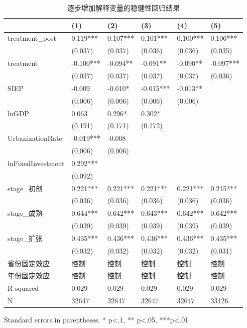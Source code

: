 \begin{table}
\caption{逐步增加解释变量的稳健性回归结果}
\label{}
\begin{center}
\begin{tabular}{llllll}
\hline
                  & (1)       & (2)       & (3)       & (4)       & (5)        \\
\hline
treatment\_post   & 0.119***  & 0.107***  & 0.101***  & 0.100***  & 0.106***   \\
                  & (0.037)   & (0.037)   & (0.036)   & (0.036)   & (0.035)    \\
treatment         & -0.100*** & -0.094**  & -0.091**  & -0.090**  & -0.097***  \\
                  & (0.037)   & (0.037)   & (0.037)   & (0.037)   & (0.036)    \\
SIEP            & -0.009    & -0.010*   & -0.015*** & -0.013**  &            \\
                  & (0.006)   & (0.006)   & (0.006)   & (0.006)   &            \\
lnGDP             & 0.063     & 0.296*    & 0.302*    &           &            \\
                  & (0.191)   & (0.171)   & (0.172)   &           &            \\
UrbanizationRate              & -0.019*** & -0.008    &           &           &            \\
                  & (0.006)   & (0.006)   &           &           &            \\
lnFixedInvestment & 0.292***  &           &           &           &            \\
                  & (0.092)   &           &           &           &            \\
stage\_初创         & 0.221***  & 0.221***  & 0.221***  & 0.221***  & 0.215***   \\
                  & (0.036)   & (0.036)   & (0.036)   & (0.036)   & (0.036)    \\
stage\_成熟         & 0.644***  & 0.642***  & 0.643***  & 0.642***  & 0.642***   \\
                  & (0.039)   & (0.039)   & (0.039)   & (0.039)   & (0.039)    \\
stage\_扩张         & 0.435***  & 0.436***  & 0.436***  & 0.436***  & 0.435***   \\
                  & (0.032)   & (0.032)   & (0.032)   & (0.032)   & (0.031)    \\
省份固定效应  & 控制 & 控制 & 控制 & 控制 & 控制 \\ 
 年份固定效应  & 控制 & 控制 & 控制 & 控制 & 控制 \\ 
\hline

R-squared         & 0.029     & 0.029     & 0.029     & 0.029     & 0.029      \\
N                 & 32647     & 32647     & 32647     & 32647     & 33126      \\
\hline
\end{tabular}
\end{center}
\end{table}
\bigskip
Standard errors in parentheses. \newline 
* p<.1, ** p<.05, ***p<.01


